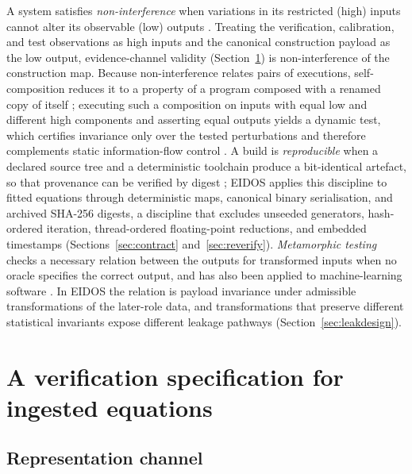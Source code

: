 A system satisfies \emph{non-interference} when variations in its restricted (high) inputs cannot alter its observable (low) outputs \citep{goguen1982noninterference}. Treating the verification, calibration, and test observations as high inputs and the canonical construction payload as the low output, evidence-channel validity (Section~\ref{sec:positioning}) is non-interference of the construction map. Because non-interference relates pairs of executions, self-composition reduces it to a property of a program composed with a renamed copy of itself \citep{barthe2004selfcomposition}; executing such a composition on inputs with equal low and different high components and asserting equal outputs yields a dynamic test, which certifies invariance only over the tested perturbations and therefore complements static information-flow control \citep{sabelfeld2003ifc}. A build is \emph{reproducible} when a declared source tree and a deterministic toolchain produce a bit-identical artefact, so that provenance can be verified by digest \citep{lamb2022reproducible}; EIDOS applies this discipline to fitted equations through deterministic maps, canonical binary serialisation, and archived SHA-256 digests, a discipline that excludes unseeded generators, hash-ordered iteration, thread-ordered floating-point reductions, and embedded timestamps (Sections~\ref{sec:contract} and~\ref{sec:reverify}). \emph{Metamorphic testing} checks a necessary relation between the outputs for transformed inputs when no oracle specifies the correct output, and has also been applied to machine-learning software \citep{chen2018metamorphic}. In EIDOS the relation is payload invariance under admissible transformations of the later-role data, and transformations that preserve different statistical invariants expose different leakage pathways (Section~\ref{sec:leakdesign}).

\section{A verification specification for ingested equations}\label{sec:positioning}

\subsection{Representation channel}

